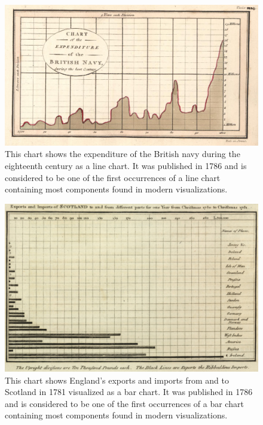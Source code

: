 \begin{figure}[tp]
\centering
\includegraphics[keepaspectratio,width=\linewidth,height=\fullh / 3]{images/playfair-line-chart.png}
\caption[Line Chart by William Playfair From 1786]{
  This chart shows the expenditure of the British navy during the eighteenth century as a line chart.
  It was published in 1786 and is considered to be one of the first occurrences of a line chart containing most components found in modern visualizations.
}
\label{fig:PlayfairLineChart}
\end{figure}

\begin{figure}[tp]
\centering
\includegraphics[keepaspectratio,width=\linewidth,height=\fullh / 3]{images/playfair-bar-chart.png}
\caption[Bar Chart by William Playfair from 1786]{
  This chart shows England's exports and imports from and to Scotland in 1781 visualized as a bar chart.
  It was published in 1786 and is considered to be one of the first occurrences of a bar chart containing most components found in modern visualizations.
}
\label{fig:PlayfairBarChart}
\end{figure}

